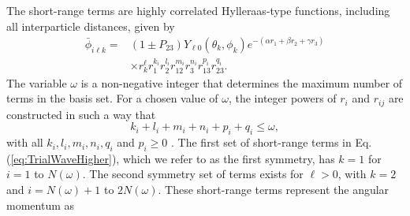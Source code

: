 \documentclass[preprint,showpacs,showkeys,preprintnumbers,amsmath,amssymb,longbibliography,pra,aps]{revtex4-1}
\begin{document}
The short-range terms are highly correlated Hylleraas-type functions, including
all interparticle distances, given by
\begin{align}
\label{eq:PhiDef}
\bar{\phi}_{i\ell k} = &\left(1 \pm P_{23}\right) Y_{\ell 0}(\theta_k,\phi_k)
e^{-(\alpha r_1 + \beta r_2 + \gamma r_3)} \nonumber \\
&\times r_k^{\ell} r_1^{k_i} r_2^{l_i} r_{12}^{m_i} r_3^{n_i} r_{13}^{p_i} r_{23}^{q_i}.
\end{align}
The variable $\omega$ is a non-negative integer that determines the maximum
number of terms in the basis set. For a chosen value of $\omega$, the integer
powers of $r_i$ and $r_{ij}$ are constructed in such a way that 
\begin{equation}
k_i + l_i + m_i + n_i + p_i + q_i \leq \omega,
\end{equation}
with all $k_i, l_i, m_i, n_i, q_i$ and $p_i \geq 0$ \cite{VanReeth2004}.
The first set of short-range terms in Eq. (\ref{eq:TrialWaveHigher}), which we
refer to as the first symmetry, has $k=1$ for $i=1$ to $N(\omega)$. The second
symmetry set of terms exists for $\ell > 0$, with $k=2$ and $i = N(\omega)+1$
to $2N(\omega)$. These short-range terms represent the angular momentum as
\end{document}
